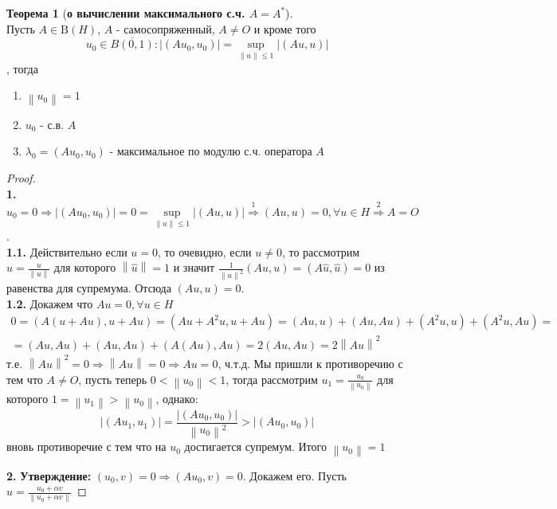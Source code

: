 \documentclass[12pt,a4paper]{article}
\theoremstyle{definition}
\newtheorem{theorem}{Теорема}
\newcommand{\norm}[1]{\left\lVert#1\right\rVert}
\newcommand{\boundedo}[1]{\textrm{B}(#1)}
\begin{document}
\begin{theorem}[\textbf{о вычислении максимального с.ч. $A = A^*$}]
	$ $ \\ Пусть $A \in \boundedo{H}$, $A$ - самосопряженный, $A \neq O$ и кроме того
	$$u_0 \in \overline{B(0, 1)}: |(Au_0, u_0)| = \sup_{\norm{u} \leq 1}{|(Au, u)|}$$
	, тогда
	\begin{enumerate}
		\item $\norm{u_0} = 1$
		\item $u_0$ - с.в. $A$
		\item $\lambda_0 = (Au_0, u_0)$ - максимальное по модулю с.ч. оператора $A$
	\end{enumerate}
\end{theorem}
\begin{proof}
	$ $ \\
	\textbf{1.} $u_0 = 0 \Rightarrow |(Au_0, u_0)| = 0 = \sup\limits_{\norm{u} \leq 1}{|(Au, u)|} \overset{\hyperref[p:1]{1}}{\Rightarrow} (Au, u) = 0, \forall u \in H \overset{\hyperref[p:2]{2}}{\Rightarrow} A = O$. \\
	\textbf{1.1.}\label{p:1} Действительно если $u = 0$, то очевидно, если $u \neq 0$, то рассмотрим \\ $\hat{u} = \frac{u}{\norm{u}}$ для которого $\norm{\hat{u}} = 1$ и значит $\frac{1}{\norm{u}^2} (Au, u) = (A\hat{u}, \hat{u}) = 0$ из равенства для супремума. Отсюда $(Au, u) = 0$. \\
	\textbf{1.2.}\label{p:2} Докажем что $Au = 0, \forall u \in H$
	\begin{multline*}
		0 = (A(u + Au), u + Au) = (Au + A^2 u, u + Au) = (Au, u) + (Au, Au) + (A^2 u, u) + (A^2 u, Au) = \\ = (Au, Au) + (Au, Au) + (A(Au), Au) = 2 (Au, Au) = 2 \norm{Au}^2
	\end{multline*}
	т.е. $\norm{Au}^2 = 0 \Rightarrow \norm{Au} = 0 \Rightarrow Au = 0$, ч.т.д.
	Мы пришли к противоречию с тем что $A \neq O$, пусть теперь $0 < \norm{u_0} < 1$, тогда рассмотрим $u_1 = \frac{u_0}{\norm{u_0}}$ для которого $1 = \norm{u_1} > \norm{u_0}$, однако:
	$$|(Au_1, u_1)| = \frac{|(Au_0, u_0)|}{\norm{u_0}^2} > |(Au_0, u_0)|$$ вновь противоречие с тем что на $u_0$ достигается супремум. Итого $\norm{u_0} = 1$
	
	\noindent \textbf{2.} \textbf{Утверждение:} $(u_0, v) = 0 \Rightarrow (Au_0, v) = 0$. Докажем его. Пусть $u = \frac{u_0 + \alpha v}{\norm{u_0 + \alpha v}}$
\end{proof}

\newpage
\renewcommand{\listtheoremname}{Список теорем и утверждений}
\listoftheorems[ignoreall, show={theorem,corollary}]
\end{document}
